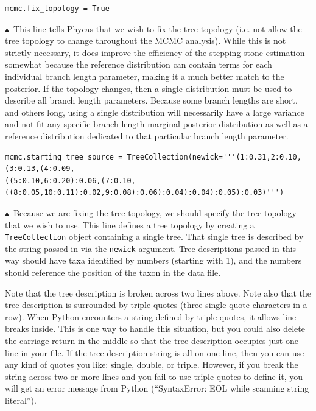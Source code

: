 \documentclass[10pt]{article}
\newcommand{\code}[1]{{\tt #1}}					%
\newcommand{\cmd}[1]{{\tt \small #1}\index{#1}}	%
\newcommand{\pointup}{$\blacktriangle$}
\begin{document}
\begin{samepage}
\begin{verbatim}
mcmc.fix_topology = True
\end{verbatim}
\pointup\ This line tells Phycas that we wish to fix the tree topology (i.e. not allow the tree topology to change throughout the MCMC analysis). While this is not strictly necessary, it does improve the efficiency of the stepping stone estimation somewhat because the reference distribution can contain terms for each individual branch length parameter, making it a much better match to the posterior. If the topology changes, then a single distribution must be used to describe all branch length parameters. Because some branch lengths are short, and others long, using a single distribution will necessarily have a large variance and not fit any specific branch length marginal posterior distribution as well as a reference distribution dedicated to that particular branch length parameter.
\end{samepage}

\begin{samepage}
\begin{verbatim}
mcmc.starting_tree_source = TreeCollection(newick='''(1:0.31,2:0.10,(3:0.13,(4:0.09,
((5:0.10,6:0.20):0.06,(7:0.10,((8:0.05,10:0.11):0.02,9:0.08):0.06):0.04):0.04):0.05):0.03)''')
\end{verbatim}
\pointup\ Because we are fixing the tree topology, we should specify the tree topology that we wish to use. This line defines a tree topology by creating a \cmd{TreeCollection} object containing a single tree. That single tree is described by the string passed in via the \code{newick} argument. Tree descriptions passed in this way should have taxa identified by numbers (starting with 1), and the numbers should reference the position of the taxon in the data file. 

Note that the tree description is broken across two lines above. Note also that the tree description is surrounded by triple quotes (three single quote characters in a row). When Python encounters a string defined by triple quotes, it allows line breaks inside. This is one way to handle this situation, but you could also delete the carriage return in the middle so that the tree description occupies just one line in your file. If the tree description string is all on one line, then you can use any kind of quotes you like: single, double, or triple. However, if you break the string across two or more lines and you fail to use triple quotes to define it, you will get an error message from Python (``SyntaxError: EOL while scanning string literal'').
\end{samepage}
\end{document}
